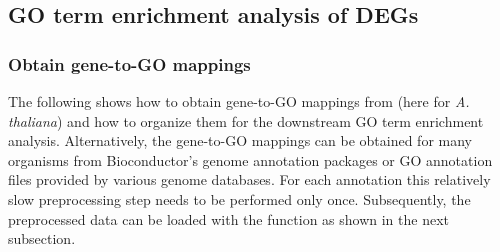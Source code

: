 \documentclass{article}\usepackage[]{graphicx}\usepackage[]{color}
\begin{document}
\subsection{GO term enrichment analysis of DEGs}
\subsubsection{Obtain gene-to-GO mappings}
The following shows how to obtain gene-to-GO mappings from  (here for \textit{A. thaliana}) and how to organize them for the downstream GO term enrichment analysis. Alternatively, the gene-to-GO mappings can be obtained for many organisms from Bioconductor's   genome annotation packages or GO annotation files provided by various genome databases. For each annotation this relatively slow preprocessing step needs to be performed only once. Subsequently, the preprocessed data can be loaded with the  function as shown in the next subsection. 
\end{document}
